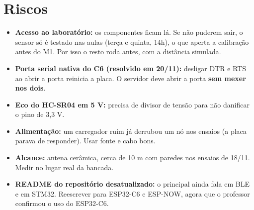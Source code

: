 \documentclass[11pt,a4paper]{article}
\newcommand{\cod}[1]{\texttt{\detokenize{#1}}}
\begin{document}
\section{Riscos}

\begin{itemize}
  \item \textbf{Acesso ao laboratório:} os componentes ficam lá. Se não puderem sair, o sensor só é testado nas aulas (terça e quinta, 14h), o que aperta a calibração antes do M1. Por isso o resto roda antes, com a distância simulada.
  \item \textbf{Porta serial nativa do C6 (resolvido em 20/11):} desligar DTR e RTS ao abrir a porta reinicia a placa. O servidor deve abrir a porta \textbf{sem mexer nos dois}.
  \item \textbf{Eco do HC-SR04 em 5 V:} precisa de divisor de tensão para não danificar o pino de 3,3 V.
  \item \textbf{Alimentação:} um carregador ruim já derrubou um nó nos ensaios (a placa parava de responder). Usar fonte e cabo bons.
  \item \textbf{Alcance:} antena cerâmica, cerca de 10 m com paredes nos ensaios de 18/11. Medir no lugar real da bancada.
  \item \textbf{README do repositório desatualizado:} o \cod{README.MD} principal ainda fala em BLE e em STM32. Reescrever para ESP32-C6 e ESP-NOW, agora que o professor confirmou o uso do ESP32-C6.
\end{itemize}
\end{document}
